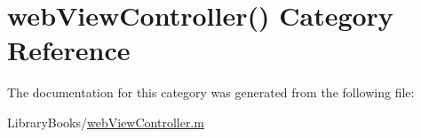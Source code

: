\hypertarget{categoryweb_view_controller_07_08}{}\section{web\+View\+Controller() Category Reference}
\label{categoryweb_view_controller_07_08}


The documentation for this category was generated from the following file\+:\begin{DoxyCompactItemize}
\item 
Library\+Books/\hyperlink{web_view_controller_8m}{web\+View\+Controller.\+m}\end{DoxyCompactItemize}

